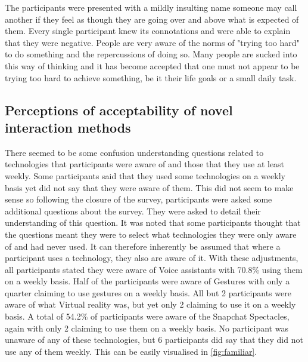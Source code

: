 \documentclass{l4proj}
\begin{document}
The participants were presented with a mildly insulting name someone may call another if they feel as though they are going over and above what is expected of them. Every single participant knew its connotations and were able to explain that they were negative. People are very aware of the norms of "trying too hard" to do something and the repercussions of doing so. Many people are sucked into this way of thinking and it has become accepted that one must not appear to be trying too hard to achieve something, be it their life goals or a small daily task.

\subsection{Perceptions of acceptability of novel interaction methods}

There seemed to be some confusion understanding questions related to technologies that participants were aware of and those that they use at least weekly. Some participants said that they used some technologies on a weekly basis yet did not say that they were aware of them. This did not seem to make sense so following the closure of the survey, participants were asked some additional questions about the survey. They were asked to detail their understanding of this question. It was noted that some participants thought that the questions meant they were to select what technologies they were only aware of and had never used. It can therefore inherently be assumed that where a participant uses a technology, they also are aware of it. With these adjustments, all participants stated they were aware of Voice assistants with 70.8\% using them on a weekly basis. Half of the participants were aware of Gestures with only a quarter claiming to use gestures on a weekly basis. All but 2 participants were aware of what Virtual reality was, but yet only 2 claiming to use it on a weekly basis. A total of 54.2\% of participants were aware of the Snapchat Spectacles, again with only 2 claiming to use them on a weekly basis. No participant was unaware of any of these technologies, but 6 participants did say that they did not use any of them weekly. This can be easily visualised in \autoref{fig:familiar}.
\end{document}
